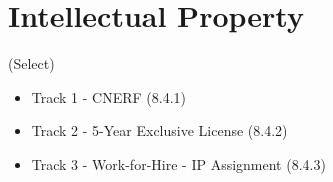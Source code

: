 \section{Intellectual Property}
(Select)
\begin{itemize}
    \item Track 1 - CNERF (8.4.1)
    \item Track 2 - 5-Year Exclusive License (8.4.2)
    \item Track 3 - Work-for-Hire - IP Assignment (8.4.3)
\end{itemize}
